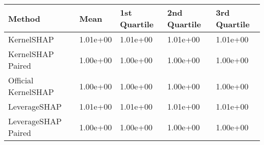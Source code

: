 \begin{tabular}{lllll}
  \toprule
  \textbf{Method} & \textbf{Mean} & \textbf{1st Quartile} & \textbf{2nd Quartile} & \textbf{3rd Quartile} \\ \midrule 
KernelSHAP & 1.01e+00 & 1.01e+00 & 1.01e+00 & 1.01e+00\\
KernelSHAP Paired & \cellcolor{gold!60}1.00e+00 & \cellcolor{gold!60}1.00e+00 & \cellcolor{gold!60}1.00e+00 & \cellcolor{gold!60}1.00e+00\\
Official KernelSHAP & \cellcolor{gold!60}1.00e+00 & \cellcolor{gold!60}1.00e+00 & \cellcolor{gold!60}1.00e+00 & \cellcolor{gold!60}1.00e+00\\
LeverageSHAP & 1.01e+00 & 1.01e+00 & 1.01e+00 & 1.01e+00\\
LeverageSHAP Paired & \cellcolor{gold!60}1.00e+00 & \cellcolor{gold!60}1.00e+00 & \cellcolor{gold!60}1.00e+00 & \cellcolor{gold!60}1.00e+00\\
\bottomrule
\end{tabular}